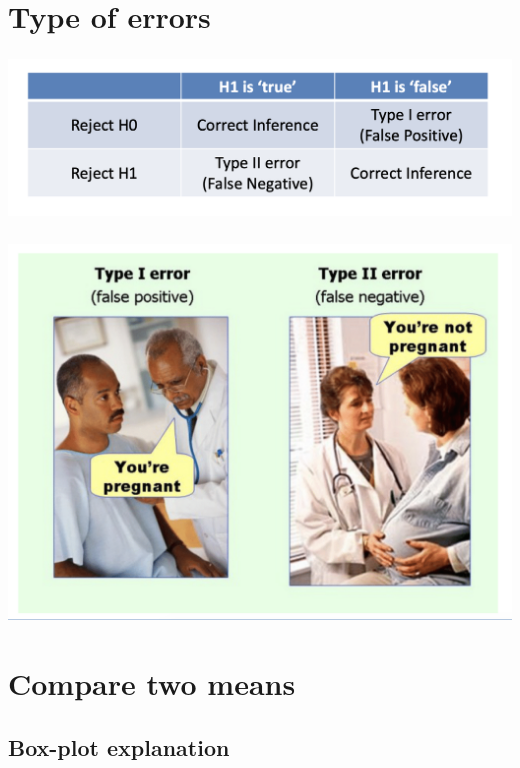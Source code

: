 \documentclass[t, 11pt]{beamer}
\begin{document}
	\section{Type of errors}
    	\begin{frame}
	\frametitle{\insertsection} 
	\framesubtitle{\insertsubsection} 
	
	\begin{center}
		\includegraphics[scale=0.5]{er1}
	\end{center}
\end{frame}	

    	\begin{frame}
	\frametitle{\insertsection} 
	\framesubtitle{\insertsubsection} 
	
	\begin{center}
		\includegraphics[scale=0.3]{er2}
	\end{center}
\end{frame}	

\section{Compare two means }
\subsection{Box-plot explanation}
\end{document}
